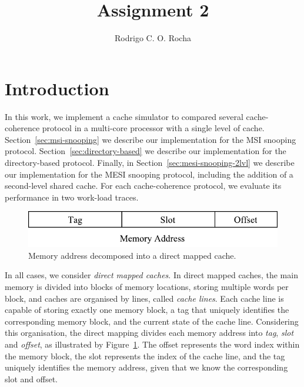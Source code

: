\documentclass[12pt, a4paper, twoside]{article}
\title{Assignment 2\\\vspace{-2ex}{\large Parallel Architectures}}
\author{Rodrigo C. O. Rocha}
\date{\vspace{-2.5ex}{\large s1533346}}
\begin{document}

\maketitle



\section{Introduction}

In this work, we implement a cache simulator to compared several cache-coherence protocol in a multi-core processor
with a single level of cache.
Section~\ref{sec:msi-snooping} we describe our implementation for the MSI snooping protocol.
Section~\ref{sec:directory-based} we describe our implementation for the directory-based protocol.
Finally, in Section~\ref{sec:mesi-snooping-2lvl} we describe our implementation for the MESI snooping protocol,
including the addition of a second-level shared cache.
For each cache-coherence protocol, we evaluate its performance in two work-load traces.

\begin{figure}
\centering
\includegraphics{figs/DirectMappedCacheAddress.pdf}
\caption{Memory address decomposed into a direct mapped cache.}
\label{fig:direct-mapping}
\end{figure}

In all cases, we consider \textit{direct mapped caches}.
In direct mapped caches, the main memory is divided into blocks of memory locations, storing multiple words per block,
and caches are organised by lines, called \textit{cache lines}. Each cache line is capable of storing exactly one memory block,
a tag that uniquely identifies the corresponding memory block, and the current state of the cache line.
Considering this organisation, the direct mapping divides each memory address into \textit{tag}, \textit{slot} and \textit{offset},
as illustrated by Figure~\ref{fig:direct-mapping}. The offset represents the word index within the memory block,
the slot represents the index of the cache line, and the tag uniquely identifies the memory address, given that we know the
corresponding slot and offset.
\end{document}
